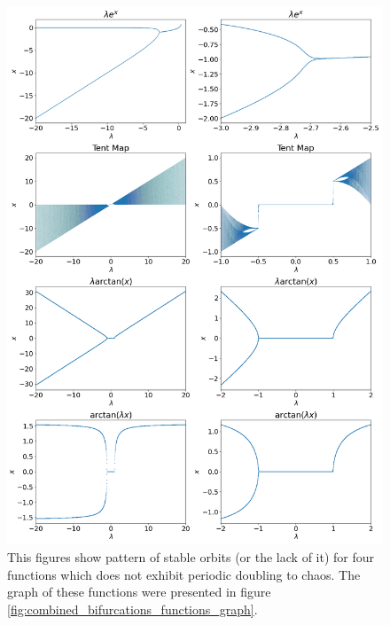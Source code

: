 \begin{figure}
	\centering
	\includegraphics[width=\textwidth]{./figures/combined_no_bifurcations.png}
	\caption{
		This figures show pattern of stable orbits (or the lack of it) for four functions which does not exhibit periodic doubling to chaos. 
		The graph of these functions were presented in figure \ref{fig:combined_bifurcations_functions_graph}.
	}
	\label{fig:combined_no_bifurcations}
\end{figure}

